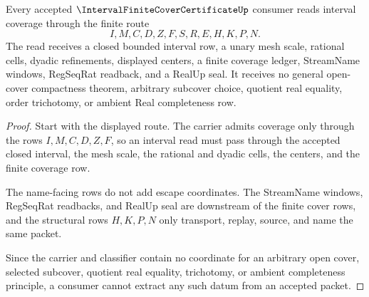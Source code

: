 \begin{theorem}
\label{thm:interval-finite-cover-certificate-nonescape}
Every accepted $\IntervalFiniteCoverCertificateUp$ consumer reads interval coverage through the finite route
$$
I,M,C,D,Z,F,S,R,E,H,K,P,N.
$$
The read receives a closed bounded interval row, a unary mesh scale, rational cells, dyadic refinements, displayed centers, a finite coverage ledger, StreamName windows, RegSeqRat readback, and a RealUp seal. It receives no general open-cover compactness theorem, arbitrary subcover choice, quotient real equality, order trichotomy, or ambient Real completeness row.
\end{theorem}
\begin{proof}
Start with the displayed route. The carrier admits coverage only through the rows $I,M,C,D,Z,F$, so an interval read must pass through the accepted closed interval, the mesh scale, the rational and dyadic cells, the centers, and the finite coverage row.

The name-facing rows do not add escape coordinates. The StreamName windows, RegSeqRat readbacks, and RealUp seal are downstream of the finite cover rows, and the structural rows $H,K,P,N$ only transport, replay, source, and name the same packet.

Since the carrier and classifier contain no coordinate for an arbitrary open cover, selected subcover, quotient real equality, trichotomy, or ambient completeness principle, a consumer cannot extract any such datum from an accepted packet.
\end{proof}

